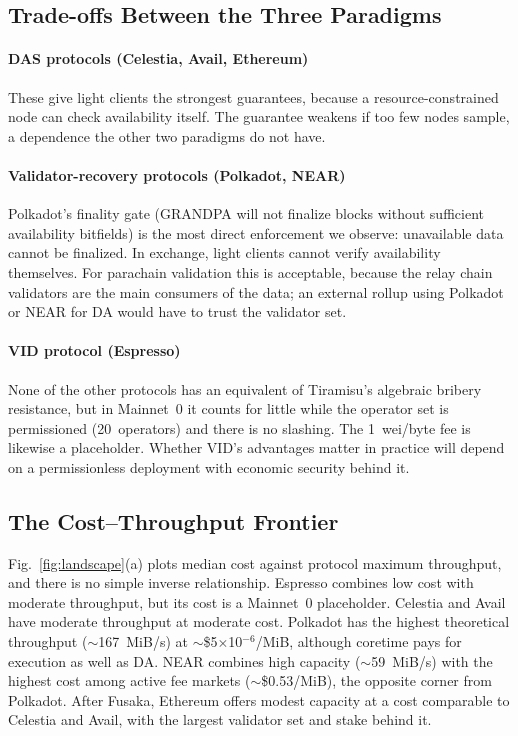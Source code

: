
\subsection{Trade-offs Between the Three Paradigms}
\label{sec:disc-paradigms}

\paragraph{DAS protocols (Celestia, Avail, Ethereum)}
These give light clients the strongest guarantees, because a resource-constrained node can check availability itself.
The guarantee weakens if too few nodes sample, a dependence the other two paradigms do not have.

\paragraph{Validator-recovery protocols (Polkadot, NEAR)}
Polkadot's finality gate (GRANDPA will not finalize blocks without sufficient availability bitfields) is the most direct enforcement we observe: unavailable data cannot be finalized.
In exchange, light clients cannot verify availability themselves.
For parachain validation this is acceptable, because the relay chain validators are the main consumers of the data; an external rollup using Polkadot or NEAR for DA would have to trust the validator set.

\paragraph{VID protocol (Espresso)}
None of the other protocols has an equivalent of Tiramisu's algebraic bribery resistance, but in Mainnet~0 it counts for little while the operator set is permissioned (20~operators) and there is no slashing.
The 1~wei/byte fee is likewise a placeholder.
Whether VID's advantages matter in practice will depend on a permissionless deployment with economic security behind it.

\subsection{The Cost--Throughput Frontier}
\label{sec:disc-frontier}

Fig.~\ref{fig:landscape}(a) plots median cost against protocol maximum throughput, and there is no simple inverse relationship.
Espresso combines low cost with moderate throughput, but its cost is a Mainnet~0 placeholder.
Celestia and Avail have moderate throughput at moderate cost.
Polkadot has the highest theoretical throughput ($\sim$167~MiB/s) at $\sim$\$5$\times$10$^{-6}$/MiB, although coretime pays for execution as well as DA.
NEAR combines high capacity ($\sim$59~MiB/s) with the highest cost among active fee markets ($\sim$\$0.53/MiB), the opposite corner from Polkadot.
After Fusaka, Ethereum offers modest capacity at a cost comparable to Celestia and Avail, with the largest validator set and stake behind it.

